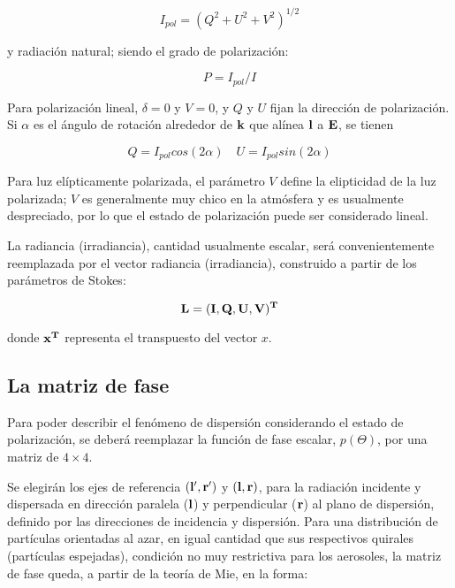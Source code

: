 \begin{equation}
 I_{pol}=(Q^{2}+U^{2}+V^{2})^{1/2}
\label{lenoble6}
 \end{equation}

y radiación natural; siendo el grado de polarización:

\begin{equation}
P=I_{pol}/I
\label{lenoble7}
\end{equation}

Para polarización lineal, $\delta=0$ y $V=0$, y $Q$ y $U$ fijan la dirección de polarización.
Si $\alpha$ es el ángulo de rotación alrededor de $\bf{k}$ que alínea $\bf{l}$ a $\bf{E}$, se tienen

\begin{equation}
Q=I_{pol}cos(2\alpha)\quad
U=I_{pol}sin(2\alpha)
\label{lenoble8}
\end{equation}

Para luz elípticamente polarizada, el parámetro $V$ define la elipticidad de la luz polarizada; $V$ es generalmente muy chico en la atmósfera y es usualmente despreciado, por lo que el estado de polarización puede ser considerado lineal.

La radiancia (irradiancia), cantidad usualmente escalar, será convenientemente reemplazada por el vector radiancia (irradiancia), construido a partir de los parámetros de Stokes:

\begin{equation}
 \bf{L}=(I,Q,U,V)^{T}
\label{lenoble9}
 \end{equation}

donde $\bf{x}^{T}$ representa el transpuesto del vector $x$.

\subsection{La matriz de fase}
\label{ch:marcofisico:matrizdefase}

Para poder describir el fenómeno de dispersión considerando el estado de polarización, se deberá reemplazar la función de fase escalar, $p(\Theta)$, por una matriz de $4 \times 4$.

Se elegirán los ejes de referencia $(\bf{l'},\bf{r'})$ y $(\bf{l},\bf{r})$, para la radiación incidente y dispersada en dirección paralela ($\bf{l}$) y perpendicular ($\bf{r}$) al plano de dispersión, definido por las direcciones de incidencia y dispersión. Para una distribución de partículas orientadas al azar, en igual cantidad que sus respectivos quirales (partículas espejadas), condición no muy restrictiva para los aerosoles, la matriz de fase queda, a partir de la teoría de Mie\cite{mischenko}, en la forma:

